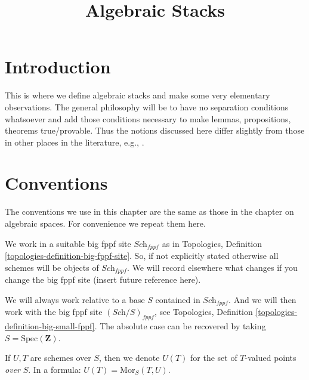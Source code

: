 

%


\title{Algebraic Stacks}


\maketitle

\label{section-phantom}

\tableofcontents

\section{Introduction}
\label{section-introduction}

\noindent
This is where we define algebraic stacks and make some very elementary
observations. The general philosophy will be to have no separation
conditions whatsoever and add those conditions necessary to make lemmas,
propositions, theorems true/provable. Thus the notions discussed here
differ slightly from those in other places in the literature, e.g.,
\cite{LM-B}.



\section{Conventions}
\label{section-conventions}

\noindent
The conventions we use in this chapter are the same as those in the
chapter on algebraic spaces. For convenience we repeat them here.

\medskip\noindent
We work in a suitable big fppf site $\textit{Sch}_{fppf}$
as in Topologies, Definition \ref{topologies-definition-big-fppf-site}.
So, if not explicitly stated otherwise all schemes will be objects
of $\textit{Sch}_{fppf}$.
We will record elsewhere what changes if you change the big
fppf site (insert future reference here).

\medskip\noindent
We will always work relative to a base $S$ contained in $\textit{Sch}_{fppf}$.
And we will then work with the big fppf site $(\textit{Sch}/S)_{fppf}$,
see Topologies, Definition \ref{topologies-definition-big-small-fppf}.
The absolute case can be recovered by taking
$S = \text{Spec}(\mathbf{Z})$.

\medskip\noindent
If $U, T$ are schemes over $S$, then we denote
$U(T)$ for the set of $T$-valued points {\it over} $S$.
In a formula: $U(T) = \text{Mor}_S(T, U)$.


